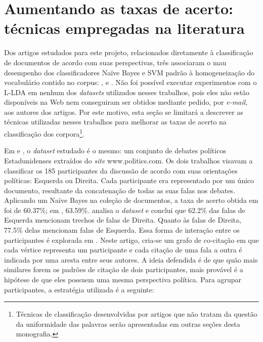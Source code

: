 \section{Aumentando as taxas de acerto: técnicas empregadas na literatura}

Dos artigos estudados para este projeto, relacionados diretamente à classificação de documentos de acordo com suas perspectivas, três associaram o mau desempenho dos classificadores Naïve Bayes e SVM padrão à homogeneização do vocabulário contido no corpus: \cite{malouf-taking_sides}, \cite{aaai-politics} e \cite{efron}. Não foi possível executar experimentos com o L-LDA em nenhum dos \emph{datasets} utilizados nesses trabalhos, pois eles não estão disponíveis na Web nem conseguiram ser obtidos mediante pedido, por \emph{e-mail}, aos autores dos artigos. Por este motivo, esta seção se limitará a descrever as técnicas utilizadas nesses trabalhos para melhorar as taxas de acerto na classificação dos corpora\footnote{Técnicas de classificação desenvolvidas por artigos que não tratam da questão da uniformidade das palavras serão apresentadas em outras seções desta monografia.}.

Em \cite{malouf-taking_sides} e \cite{aaai-politcs}, o \emph{dataset} estudado é o mesmo: um conjunto de debates políticos Estadunidenses extraídos do \emph{site} www.politics.com. Os dois trabalhos visavam a classificar os 185 participantes da discussão de acordo com suas orientações políticas: Esquerda ou Direita. Cada participante era representado por um único documento, resultante da concatenação de todas as suas falas nos debates. Aplicando um Naïve Bayes na coleção de documentos, a taxa de acerto obtida em \cite{aaai-politics} foi de 60.37\%; em \cite{malouf-takind_sides}, 63.59\%. \cite{aaai-politcs} analisa o \emph{dataset} e conclui que 62.2\% das falas de Esquerda mencionam trechos de falas de Direita. Quanto às falas de Direita, 77.5\% delas mencionam falas de Esquerda. Essa forma de interação entre os participantes é explorada em \cite{malouf-taking_sides}. Neste artigo, cria-se um grafo de co-citação em que cada vértice representa um participante e cada citação de uma fala a outra é indicada por uma aresta entre seus autores. A ideia defendida é de que quão mais similares forem os padrões de citação de dois participantes, mais provável é a hipótese de que eles possuem uma mesma perspectiva política. Para agrupar participantes, a estratégia utilizada é a seguinte:

